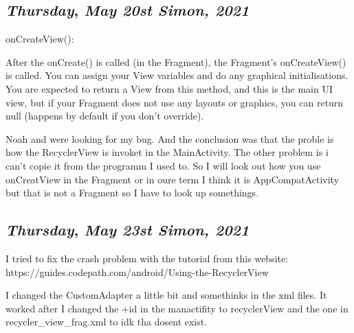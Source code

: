 \begin{center}
\section*{\month}
\end{center}

\def\day{\textit{May 20st Simon, 2021}}
\def\weekday{\textit{Thursday}}
\subsection*{\weekday, \day}

onCreateView():

After the onCreate() is called (in the Fragment), the Fragment's onCreateView() is called. You can assign your View variables and do any graphical initialisations. You are expected to return a View from this method, and this is the main UI view, but if your Fragment does not use any layouts or graphics, you can return null (happens by default if you don't override).

Noah and were looking for my bug. And the conclusion was that the proble is how the RecyclerView is invoket in the MainActivity. The other problem is i can't 
copie it from the programm I used to. So I will look out how you use onCreatView in the Fragment or in oure term I think it is AppCompatActivity but that is not a Fragment so 
I have to look up somethings. 



\def\day{\textit{May 23st Simon, 2021}}
\def\weekday{\textit{Thursday}}
\subsection*{\weekday, \day}

I tried to fix the crash problem with the tutorial from this website:
https://guides.codepath.com/android/Using-the-RecyclerView

I changed the CustomAdapter a little bit and somethinks in the xml files.
It worked after I changed the +id in the manactifity to recyclerView and the one in recycler_view_frag.xml to idk tha dosent exist.
